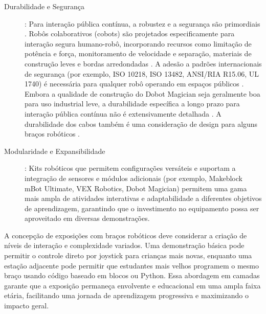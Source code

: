 \documentclass[%
  12pt,%
  a4paper,%
  oneside,%
  openright,%
  sumario = abnt-6027-2012,%
  chapter = TITLE,%
  pretextualoneside,%
  fontetimes,%
  semrecuonosumario,%
  usemakeindex,%
  pardeassinaturas,%
  english,%
  french,%
  spanish,%
  brazil,%
]{utfpr}%
\begin{document}
\begin{description}
		\item [Durabilidade e Segurança]: Para interação pública contínua, a robustez e a segurança são primordiais \cite{ross2024BeyondExhibits}. Robôs colaborativos (cobots) são projetados especificamente para interação segura humano-robô, incorporando recursos como limitação de potência e força, monitoramento de velocidade e separação, materiais de construção leves e bordas arredondadas \cite{top3dshopDobotMagicianReview2023}. A adesão a padrões internacionais de segurança (por exemplo, ISO 10218, ISO 13482, ANSI/RIA R15.06, UL 1740) é necessária para qualquer robô operando em espaços públicos \cite{standardBotsCobotSafetyStandards2025}. Embora a qualidade de construção do Dobot Magician seja geralmente boa para uso industrial leve, a durabilidade específica a longo prazo para interação pública contínua não é extensivamente detalhada \cite{robotlabDobotClassroomPack2025}. A durabilidade dos cabos também é uma consideração de design para alguns braços robóticos \cite{bostonDynamicsSpot2025}.
		\item [Modularidade e Expansibilidade]: Kits robóticos que permitem configurações versáteis e suportam a integração de sensores e módulos adicionais (por exemplo, Makeblock mBot Ultimate, VEX Robotics, Dobot Magician) \cite{makeblockMBot22025} permitem uma gama mais ampla de atividades interativas e adaptabilidade a diferentes objetivos de aprendizagem, garantindo que o investimento no equipamento possa ser aproveitado em diversas demonstrações.
	\end{description}


A concepção de exposições com braços robóticos deve considerar a criação de níveis de interação e complexidade variados. Uma demonstração básica pode permitir o controle direto por joystick para crianças mais novas, enquanto uma estação adjacente pode permitir que estudantes mais velhos programem o mesmo braço usando código baseado em blocos ou Python. Essa abordagem em camadas garante que a exposição permaneça envolvente e educacional em uma ampla faixa etária, facilitando uma jornada de aprendizagem progressiva e maximizando o impacto geral.
\end{document}
